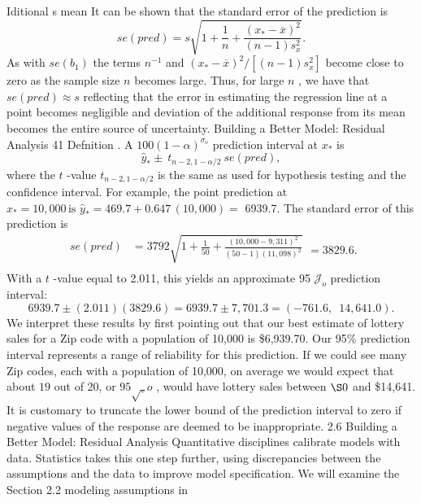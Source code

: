 \documentclass[11pt]{article}
\begin{document}
Iditional
s mean
It can be shown that the standard error of the prediction is
\[
s e ( p r e d )=s \sqrt{1+\frac{1} {n}+\frac{\left( x_{*}-\overline{{x}} \right)^{2}} {\left( n-1 \right) s_{x}^{2}}} .
\]
As with \(s e ( b_{1} )\) the terms \(n^{-1}\) and \(\left( x_{*}-\overline{{x}} \right)^{2} / \left[ ( n-1 ) s_{x}^{2} \right]\) become close to zero
 as the sample size \(n\) becomes large. Thus, for large \(n\) , we have that \(s e ( p r e d ) \approx s\)
reflecting that the error in estimating the regression line at a point becomes
 negligible and deviation of the additional response from its mean becomes the
entire source of uncertainty.
 Building a Better Model: Residual Analysis 41
 Defnition . A \(1 0 0 ( 1-\alpha)^{\sigma_{o}}\) prediction interval at \(x_{*}\) is
\[
\widehat{y}_{*} \pm\ t_{n-2 , 1-\alpha/ 2} \ s e ( p r e d ) , \tag{2.7}
\]
 where the \(t\) -value \(t_{n-2 , 1-\alpha/ 2}\) is the same as used for hypothesis testing and the
 confidence interval.
For example, the point prediction at \(x_{\ast}=1 0 {,} 0 0 0 \, \mathrm{i s} \, \, \widehat{y}_{\ast}=4 6 9 . 7+0 . 6 4 7 \, ( 1 0 {,} 0 0 0 )=\)
6939.7. The standard error of this prediction is
\[
\begin{aligned} {s e ( p r e d )} & {{}=3 7 9 2 \sqrt{1+\frac{1} {5 0}+\frac{\left( 1 0 {,} 0 0 0-9 {,} 3 1 1 \right)^{2}} {( 5 0-1 ) ( 1 1 {,} 0 9 8 )^{2}}}} \\ \end{aligned}=3 8 2 9 . 6 .
\]
With a \(t\) -value equal to 2.011, this yields an approximate 95 \(\mathcal{J}_{o}\) prediction interval:
\[
6 9 3 9 . 7 \pm( 2 . 0 1 1 ) ( 3 8 2 9 . 6 )=6 9 3 9 . 7 \pm7 , 7 0 1 . 3=(-7 6 1 . 6 , \, \, \, 1 4 , 6 4 1 . 0 ) .
\]
We interpret these results by first pointing out that our best estimate of lottery
 sales for a \(\mathrm{Z i p}\) code with a population of 10,000 is \$6,939.70. Our 95\% prediction
 interval represents a range of reliability for this prediction. If we could see many
Zip codes, each with a population of 10,000, on average we would expect that
about \(1 9\) out of 20, or \(9 5 \surd_{o}\) , would have lottery sales between \(\S0\) and \$14,641.
It is customary to truncate the lower bound of the prediction interval to zero if
 negative values of the response are deemed to be inappropriate.
2.6 Building a Better Model: Residual Analysis
Quantitative disciplines calibrate models with data. Statistics takes this one step
further, using discrepancies between the assumptions and the data to improve
model specification. We will examine the Section 2.2 modeling assumptions in
\end{document}

